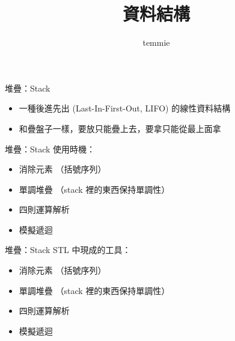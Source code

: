 \documentclass[mathserif]{beamer}
\title{資料結構}
\author{temmie}
\date{}
\begin{document}
\begin{frame}
    \titlepage
\end{frame}

\begin{frame}
    \tableofcontents
\end{frame}

\begin{frame}{堆疊：Stack}
    \begin{itemize}
        \item 一種後進先出 (Last-In-First-Out, LIFO) 的線性資料結構
        \item 和疊盤子一樣，要放只能疊上去，要拿只能從最上面拿
    \end{itemize}
\end{frame}

\begin{frame}{堆疊：Stack}
    使用時機：
    \begin{itemize}
        \item 消除元素 （括號序列）
        \item 單調堆疊 （stack 裡的東西保持單調性）
        \item 四則運算解析
        \item 模擬遞迴
    \end{itemize}
\end{frame}

\begin{frame}{堆疊：Stack}
    STL 中現成的工具：
    \begin{itemize}
        \item 消除元素 （括號序列）
        \item 單調堆疊 （stack 裡的東西保持單調性）
        \item 四則運算解析
        \item 模擬遞迴
    \end{itemize}
\end{frame}
\end{document}

